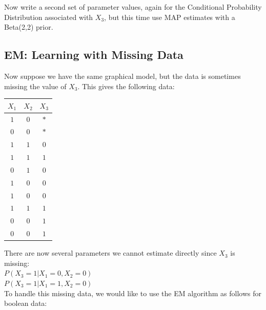 \documentclass[11pt,addpoints,answers]{exam}
\begin{document}
\begin{questions}
\begin{questions}
\clearpage

\question[2] Now write a second set of parameter values, again for the Conditional Probability Distribution associated with $X_3$, but this time use MAP estimates with a Beta(2,2) prior.

\begin{your_solution}[title=Your Answer:,height=5cm,width=15cm]
\end{your_solution}

\end{questions}

\subsection{EM: Learning with Missing Data}
 Now suppose we have the same graphical model, but the data is sometimes missing the value of $X_3$. This gives the following data: \\
\begin{center}
\begin{tabular}{|c|c|c|}
    \hline
       $X_1$ & $X_2$ & $X_3$   \\  \hline
       $1$  & $0$ & $*$   \\  \hline
       $0$ & $0$ & $*$  \\  \hline
       $1$ & $1$ & $0$  \\  \hline
       $1$ & $1$ & $1$  \\  \hline
       $0$ & $1$ & $0$  \\  \hline
       $1$ & $0$ & $0$  \\  \hline
       $1$ & $0$ & $0$  \\  \hline
       $1$ & $1$ & $1$  \\  \hline
       $0$ & $0$ & $1$  \\  \hline
       $0$ & $0$ & $1$  \\  \hline
    \end{tabular}
\end{center}


There are now several parameters we cannot estimate directly since $X_3$ is missing: \\

$P(X_3=1|X_1=0,X_2=0)$ \\
$P(X_3=1|X_1=1,X_2=0)$ \\

To handle this missing data, we would like to use the EM algorithm as follows for boolean data: \\


\end{questions}
\end{document}
